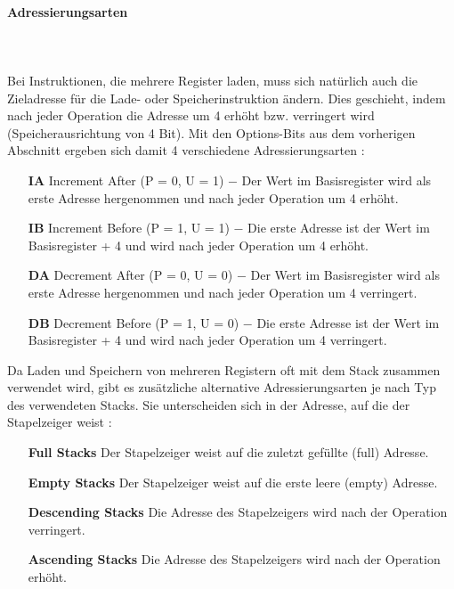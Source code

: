 \documentclass[a4paper, 11pt, onecolumn]{article}
\begin{document}
\paragraph{Adressierungsarten}\label{sec:ldmstmaddr}
~\\ \\
Bei Instruktionen, die mehrere Register laden, muss sich natürlich auch die Zieladresse für die Lade- oder Speicherinstruktion ändern. Dies geschieht, indem nach jeder Operation die Adresse um 4 erhöht bzw. verringert wird (Speicherausrichtung von 4 Bit). Mit den Options-Bits aus dem vorherigen Abschnitt ergeben sich damit 4 verschiedene Adressierungsarten \cite{arm:2005}:


\begin{itemize}[labelwidth=2em,leftmargin =\dimexpr{}+\relax, align=parleft]
\item[\textbf{IA}] Increment After (P = 0, U = 1) $-$ Der Wert im Basisregister wird als erste Adresse hergenommen und nach jeder Operation um 4 erhöht.
\item[\textbf{IB}] Increment Before (P = 1, U = 1) $-$ Die erste Adresse ist der Wert im Basisregister + 4 und wird nach jeder Operation um 4 erhöht.
\item[\textbf{DA}] Decrement After (P = 0, U = 0) $-$ Der Wert im Basisregister wird als erste Adresse hergenommen und nach jeder Operation um 4 verringert.
\item[\textbf{DB}] Decrement Before (P = 1, U = 0) $-$ Die erste Adresse ist der Wert im Basisregister + 4 und wird nach jeder Operation um 4 verringert.
\end{itemize}

Da Laden und Speichern von mehreren Registern oft mit dem Stack zusammen verwendet wird, gibt es zusätzliche alternative Adressierungsarten je nach Typ des verwendeten Stacks. Sie unterscheiden sich in der Adresse, auf die der Stapelzeiger weist \cite{arm:2005}:


\begin{itemize}[labelwidth=10em,leftmargin =\dimexpr{}+\relax, align=parleft]
\item[\textbf{Full Stacks}] Der Stapelzeiger weist auf die zuletzt gefüllte (full) Adresse.
\item[\textbf{Empty Stacks}] Der Stapelzeiger weist auf die erste leere (empty) Adresse.
\item[\textbf{Descending Stacks}] Die Adresse des Stapelzeigers wird nach der Operation verringert.
\item[\textbf{Ascending Stacks}] Die Adresse des Stapelzeigers wird nach der Operation erhöht.
\end{itemize}
\end{document}

